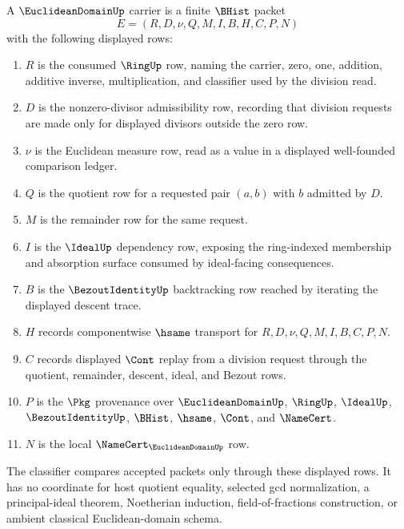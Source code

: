 \begin{definition}
\label{def:euclidean-domain-carrier}
A $\EuclideanDomainUp$ carrier is a finite $\BHist$ packet
$$
E=(R,D,\nu,Q,M,I,B,H,C,P,N)
$$
with the following displayed rows:
\begin{enumerate}
\item $R$ is the consumed $\RingUp$ row, naming the carrier, zero, one, addition, additive inverse, multiplication, and classifier used by the division read.
\item $D$ is the nonzero-divisor admissibility row, recording that division requests are made only for displayed divisors outside the zero row.
\item $\nu$ is the Euclidean measure row, read as a value in a displayed well-founded comparison ledger.
\item $Q$ is the quotient row for a requested pair $(a,b)$ with $b$ admitted by $D$.
\item $M$ is the remainder row for the same request.
\item $I$ is the $\IdealUp$ dependency row, exposing the ring-indexed membership and absorption surface consumed by ideal-facing consequences.
\item $B$ is the $\BezoutIdentityUp$ backtracking row reached by iterating the displayed descent trace.
\item $H$ records componentwise $\hsame$ transport for $R,D,\nu,Q,M,I,B,C,P,N$.
\item $C$ records displayed $\Cont$ replay from a division request through the quotient, remainder, descent, ideal, and Bezout rows.
\item $P$ is the $\Pkg$ provenance over $\EuclideanDomainUp$, $\RingUp$, $\IdealUp$, $\BezoutIdentityUp$, $\BHist$, $\hsame$, $\Cont$, and $\NameCert$.
\item $N$ is the local $\NameCert_{\EuclideanDomainUp}$ row.
\end{enumerate}
The classifier compares accepted packets only through these displayed rows. It has no coordinate for host quotient equality, selected gcd normalization, a principal-ideal theorem, Noetherian induction, field-of-fractions construction, or ambient classical Euclidean-domain schema.
\end{definition}

